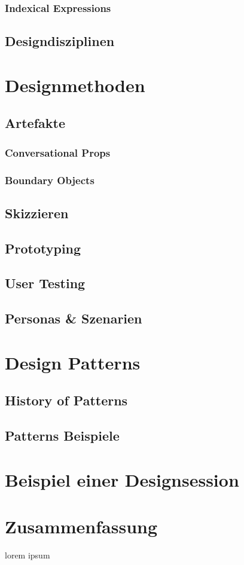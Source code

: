 \subsubsection{Indexical Expressions}
\subsection{Designdisziplinen}

\section{Designmethoden}
\subsection{Artefakte}
\subsubsection{Conversational Props}
\subsubsection{Boundary Objects}
\subsection{Skizzieren}
\subsection{Prototyping}
\subsection{User Testing}
\subsection{Personas \& Szenarien}

\section{Design Patterns}
\subsection{History of Patterns}
\subsection{Patterns Beispiele}

\section{Beispiel einer Designsession}

\section*{Zusammenfassung}
lorem ipsum